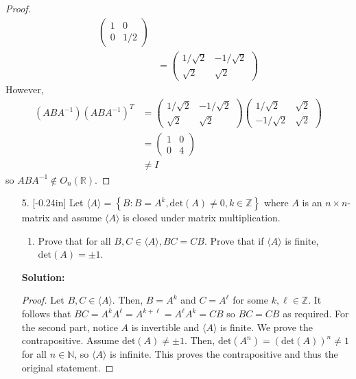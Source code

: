 \documentclass[letterpaper,12pt]{article}
\newcommand{\set}[1]{\left\{ #1 \right\}}
\theoremstyle{definition}
\begin{document}
\begin{enumerate}
\begin{mdframed}
\begin{proof}
\begin{align*}
\begin{pmatrix}
                1 & 0 \\ 0 & 1/2
            \end{pmatrix} \\
            &= \begin{pmatrix}
               1/ \sqrt{2} & -  1/ \sqrt{2} \\    \sqrt{2} &    \sqrt{2}
            \end{pmatrix}
            \end{align*}
              However,
        \begin{align*}
            (ABA^{-1}) (ABA^{-1})^T &=  \begin{pmatrix}
               1/ \sqrt{2} & -  1/ \sqrt{2} \\    \sqrt{2} &    \sqrt{2}
            \end{pmatrix} \begin{pmatrix}
               1/ \sqrt{2} & \sqrt{2} \\    -  1/ \sqrt{2} &   \sqrt{2}
            \end{pmatrix} \\
            &= \begin{pmatrix}
                1 & 0\\ 0 & 4
            \end{pmatrix} \\
            &\neq I
        \end{align*}
        so $ABA^{-1} \notin O_n(\mathbb{R})$.
        \end{proof}
    \end{mdframed}
\end{enumerate}
\pagebreak
\begin{enumerate}
    \item[5.] \reversemarginpar{}[-0.24in] Let $\langle A\rangle = \set{B : B = A^k, \mathrm{det}(A) \neq 0, k \in \mathbb{Z}}$ where $A$ is an $n\times n$-matrix and assume $\langle A \rangle $ is closed under matrix multiplication. \begin{enumerate}
        \item Prove that for all $B,C \in \langle A\rangle, BC = CB$. Prove that if $\langle A \rangle$ is finite, $\mathrm{det}(A)=\pm 1$.
    \end{enumerate}
    \begin{mdframed}
        \textbf{Solution:}
        \begin{proof}
            Let $B,C \in \langle A \rangle$. Then, $B = A^k$ and $C = A^\ell$ for some $k,\ell \in \mathbb{Z}$. It follows that $BC = A^k A^\ell = A^{k+\ell} = A^\ell A^k = CB$ so $BC = CB$ as required. For the second part, notice $A$ is invertible and $\langle A \rangle$ is finite. We prove the contrapositive. Assume $\mathrm{det}(A) \neq \pm 1$. Then, $\mathrm{det}(A^n) = (\mathrm{det}(A))^n \neq 1 $ for all $n \in \mathbb{N}$, so $\langle A\rangle$ is infinite. This proves the contrapositive and thus the original statement.
        \end{proof}
    \end{mdframed}
\end{enumerate}
\end{document}
